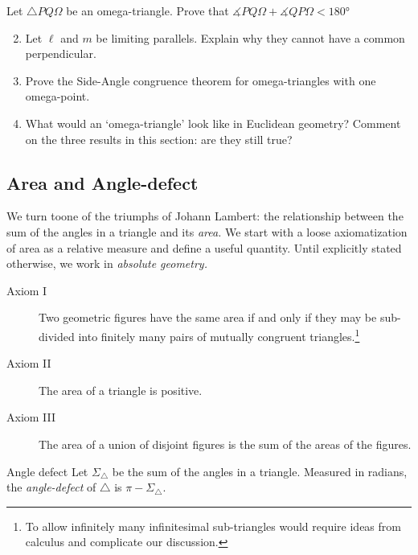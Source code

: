 % 

\begin{exercises}
\exstart Let $\triangle PQ\Omega$ be an omega-triangle. Prove that $\measuredangle PQ\Omega+\measuredangle QP\Omega< \ang{180}$
\begin{enumerate}\setcounter{enumi}{1}
  \item Let $\ell$ and $m$ be limiting parallels. Explain why they cannot have a common perpendicular.
  
  \item Prove the Side-Angle congruence theorem for omega-triangles with one omega-point.
  
  \item What would an `omega-triangle' look like in Euclidean geometry? Comment on the three results in this section: are they still true?
 \end{enumerate}
\end{exercises}

\clearpage

	

\subsection{Area and Angle-defect}\label{sec:hyparea}

We turn toone of the triumphs of Johann Lambert: the relationship between the sum of the angles in a triangle and its \emph{area.} We start with a loose axiomatization of area as a relative measure and define a useful quantity. Until explicitly stated otherwise, we work in \emph{absolute geometry.}

\begin{description}
	\item[Axiom I] Two geometric figures have the same area if and only if they may be sub-divided into finitely many pairs of mutually congruent triangles.\footnote{To allow infinitely many infinitesimal sub-triangles would require ideas from calculus and complicate our discussion.}
	\item[Axiom II] The area of a triangle is positive.
	\item[Axiom III] The area of a union of disjoint figures is the sum of the areas of the figures.
\end{description}

\begin{defn}{Angle defect}{}
Let $\Sigma_\triangle$ be the sum of the angles in a triangle. Measured in radians, the \emph{angle-defect} of $\triangle$ is $\pi-\Sigma_\triangle$.
\end{defn}

